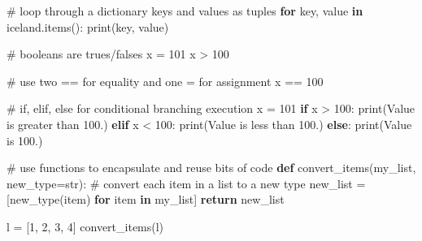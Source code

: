 \documentclass[
  letterpaper,
  DIV=11,
  numbers=noendperiod]{scrreprt}
\newenvironment{Shaded}{\begin{snugshade}}{\end{snugshade}}
\newcommand{\BuiltInTok}[1]{\textcolor[rgb]{0.00,0.23,0.31}{#1}}
\newcommand{\CommentTok}[1]{\textcolor[rgb]{0.37,0.37,0.37}{#1}}
\newcommand{\ControlFlowTok}[1]{\textcolor[rgb]{0.00,0.23,0.31}{\textbf{#1}}}
\newcommand{\DecValTok}[1]{\textcolor[rgb]{0.68,0.00,0.00}{#1}}
\newcommand{\KeywordTok}[1]{\textcolor[rgb]{0.00,0.23,0.31}{\textbf{#1}}}
\newcommand{\NormalTok}[1]{\textcolor[rgb]{0.00,0.23,0.31}{#1}}
\newcommand{\OperatorTok}[1]{\textcolor[rgb]{0.37,0.37,0.37}{#1}}
\newcommand{\StringTok}[1]{\textcolor[rgb]{0.13,0.47,0.30}{#1}}
\begin{document}
\begin{Shaded}
\begin{Highlighting}[]
\CommentTok{\# loop through a dictionary keys and values as tuples}
\ControlFlowTok{for}\NormalTok{ key, value }\KeywordTok{in}\NormalTok{ iceland.items():}
    \BuiltInTok{print}\NormalTok{(key, value)}
\end{Highlighting}
\end{Shaded}

\begin{Shaded}
\begin{Highlighting}[]
\CommentTok{\# booleans are trues/falses}
\NormalTok{x }\OperatorTok{=} \DecValTok{101}
\NormalTok{x }\OperatorTok{\textgreater{}} \DecValTok{100}
\end{Highlighting}
\end{Shaded}

\begin{Shaded}
\begin{Highlighting}[]
\CommentTok{\# use two == for equality and one = for assignment}
\NormalTok{x }\OperatorTok{==} \DecValTok{100}
\end{Highlighting}
\end{Shaded}

\begin{Shaded}
\begin{Highlighting}[]
\CommentTok{\# if, elif, else for conditional branching execution}
\NormalTok{x }\OperatorTok{=} \DecValTok{101}
\ControlFlowTok{if}\NormalTok{ x }\OperatorTok{\textgreater{}} \DecValTok{100}\NormalTok{:}
    \BuiltInTok{print}\NormalTok{(}\StringTok{\textquotesingle{}Value is greater than 100.\textquotesingle{}}\NormalTok{)}
\ControlFlowTok{elif}\NormalTok{ x }\OperatorTok{\textless{}} \DecValTok{100}\NormalTok{:}
    \BuiltInTok{print}\NormalTok{(}\StringTok{\textquotesingle{}Value is less than 100.\textquotesingle{}}\NormalTok{)}
\ControlFlowTok{else}\NormalTok{:}
    \BuiltInTok{print}\NormalTok{(}\StringTok{\textquotesingle{}Value is 100.\textquotesingle{}}\NormalTok{)}
\end{Highlighting}
\end{Shaded}

\begin{Shaded}
\begin{Highlighting}[]
\CommentTok{\# use functions to encapsulate and reuse bits of code}
\KeywordTok{def}\NormalTok{ convert\_items(my\_list, new\_type}\OperatorTok{=}\BuiltInTok{str}\NormalTok{):}
    \CommentTok{\# convert each item in a list to a new type}
\NormalTok{    new\_list }\OperatorTok{=}\NormalTok{ [new\_type(item) }\ControlFlowTok{for}\NormalTok{ item }\KeywordTok{in}\NormalTok{ my\_list]}
    \ControlFlowTok{return}\NormalTok{ new\_list}

\NormalTok{l }\OperatorTok{=}\NormalTok{ [}\DecValTok{1}\NormalTok{, }\DecValTok{2}\NormalTok{, }\DecValTok{3}\NormalTok{, }\DecValTok{4}\NormalTok{]}
\NormalTok{convert\_items(l)}
\end{Highlighting}
\end{Shaded}
\end{document}
